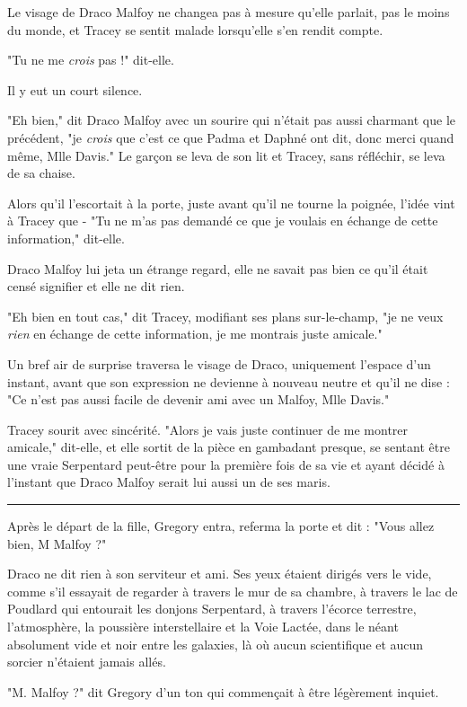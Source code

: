 Le visage de Draco Malfoy ne changea pas à mesure qu'elle parlait, pas le moins du monde, et Tracey se sentit malade lorsqu'elle s'en rendit compte.

"Tu ne me \emph{crois}  pas !" dit-elle.

Il y eut un court silence.

"Eh bien," dit Draco Malfoy avec un sourire qui n'était pas aussi charmant que le précédent, "je \emph{crois}  que c'est ce que Padma et Daphné ont dit, donc merci quand même, Mlle Davis." Le garçon se leva de son lit et Tracey, sans réfléchir, se leva de sa chaise.

Alors qu'il l'escortait à la porte, juste avant qu'il ne tourne la poignée, l'idée vint à Tracey que - "Tu ne m'as pas demandé ce que je voulais en échange de cette information," dit-elle.

Draco Malfoy lui jeta un étrange regard, elle ne savait pas bien ce qu'il était censé signifier et elle ne dit rien.

"Eh bien en tout cas," dit Tracey, modifiant ses plans sur-le-champ, "je ne veux \emph{rien}  en échange de cette information, je me montrais juste amicale."

Un bref air de surprise traversa le visage de Draco, uniquement l'espace d'un instant, avant que son expression ne devienne à nouveau neutre et qu'il ne dise : "Ce n'est pas aussi facile de devenir ami avec un Malfoy, Mlle Davis."

Tracey sourit avec sincérité. "Alors je vais juste continuer de me montrer amicale," dit-elle, et elle sortit de la pièce en gambadant presque, se sentant être une vraie Serpentard peut-être pour la première fois de sa vie et ayant décidé à l'instant que Draco Malfoy serait lui aussi un de ses maris.
\par\noindent\rule{\textwidth}{0.4pt}
Après le départ de la fille, Gregory entra, referma la porte et dit : "Vous allez bien, M Malfoy ?"

Draco ne dit rien à son serviteur et ami. Ses yeux étaient dirigés vers le vide, comme s'il essayait de regarder à travers le mur de sa chambre, à travers le lac de Poudlard qui entourait les donjons Serpentard, à travers l'écorce terrestre, l'atmosphère, la poussière interstellaire et la Voie Lactée, dans le néant absolument vide et noir entre les galaxies, là où aucun scientifique et aucun sorcier n'étaient jamais allés.

"M. Malfoy ?" dit Gregory d'un ton qui commençait à être légèrement inquiet.

